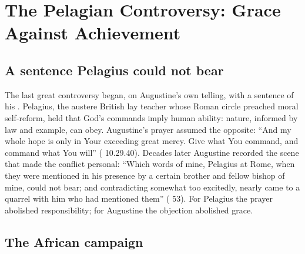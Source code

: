 \section{The Pelagian Controversy: Grace Against Achievement}

\subsection{A sentence Pelagius could not bear}

The last great controversy began, on Augustine's own telling, with a
sentence of his . Pelagius, the austere British lay
teacher whose Roman circle preached moral self-reform, held that God's
commands imply human ability: nature, informed by law and example, can obey.
Augustine's prayer assumed the opposite: ``And my whole hope is only in Your
exceeding great mercy. Give what You command, and command what You will''
( 10.29.40). Decades later Augustine recorded the scene
that made the conflict personal: ``Which words of mine, Pelagius at Rome,
when they were mentioned in his presence by a certain brother and fellow
bishop of mine, could not bear; and contradicting somewhat too excitedly,
nearly came to a quarrel with him who had mentioned them'' ( 53). For Pelagius the prayer abolished
responsibility; for Augustine the objection abolished grace.

\subsection{The African campaign}

